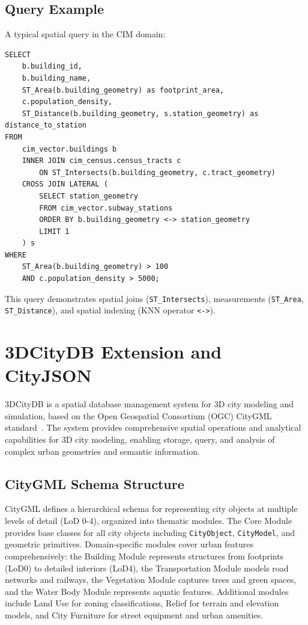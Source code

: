 \subsection{Query Example}

A typical spatial query in the CIM domain:

\begin{lstlisting}[style=sqlstyle, caption=PostGIS spatial join with measurement]
SELECT 
    b.building_id,
    b.building_name,
    ST_Area(b.building_geometry) as footprint_area,
    c.population_density,
    ST_Distance(b.building_geometry, s.station_geometry) as distance_to_station
FROM 
    cim_vector.buildings b
    INNER JOIN cim_census.census_tracts c 
        ON ST_Intersects(b.building_geometry, c.tract_geometry)
    CROSS JOIN LATERAL (
        SELECT station_geometry
        FROM cim_vector.subway_stations
        ORDER BY b.building_geometry <-> station_geometry
        LIMIT 1
    ) s
WHERE 
    ST_Area(b.building_geometry) > 100
    AND c.population_density > 5000;
\end{lstlisting}

This query demonstrates spatial joins (\texttt{ST\_Intersects}), measurements (\texttt{ST\_Area}, \texttt{ST\_Distance}), and spatial indexing (KNN operator \texttt{<->}).

\section{3DCityDB Extension and CityJSON}

3DCityDB is a spatial database management system for 3D city modeling and simulation, based on the Open Geospatial Consortium (OGC) CityGML standard~\cite{gröger2012citygml}. The system provides comprehensive spatial operations and analytical capabilities for 3D city modeling, enabling storage, query, and analysis of complex urban geometries and semantic information.

\subsection{CityGML Schema Structure}

CityGML defines a hierarchical schema for representing city objects at multiple levels of detail (LoD 0-4), organized into thematic modules. The Core Module provides base classes for all city objects including \texttt{CityObject}, \texttt{CityModel}, and geometric primitives. Domain-specific modules cover urban features comprehensively: the Building Module represents structures from footprints (LoD0) to detailed interiors (LoD4), the Transportation Module models road networks and railways, the Vegetation Module captures trees and green spaces, and the Water Body Module represents aquatic features. Additional modules include Land Use for zoning classifications, Relief for terrain and elevation models, and City Furniture for street equipment and urban amenities.

